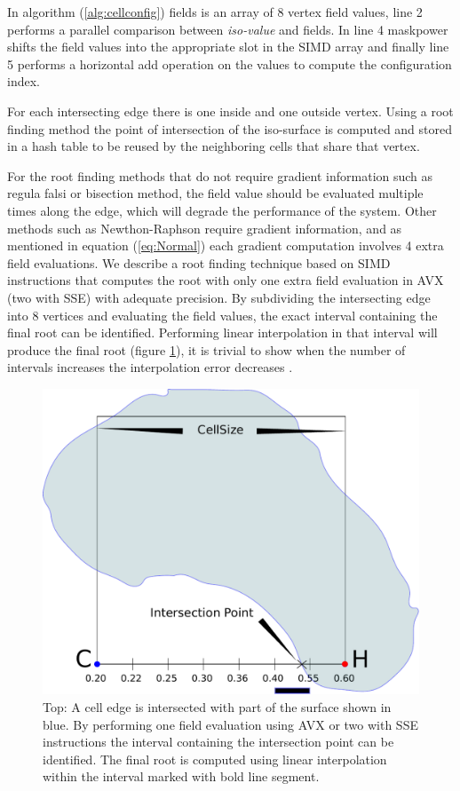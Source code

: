In algorithm (\ref{alg:cellconfig}) fields is an array of 8 vertex field values, 
line 2 performs a parallel comparison between \textit{iso-value} and fields. 
In line 4 maskpower shifts the field values into the appropriate slot in the SIMD array and finally line 5
performs a horizontal add operation on the values to compute the configuration index.

For each intersecting edge there is one inside and one outside vertex.
Using a root finding method the point of intersection of the iso-surface is computed and stored in a 
hash table to be reused by the neighboring cells that share that vertex. 

For the root finding methods that do not require gradient information such as regula falsi or bisection method, 
the field value should be evaluated multiple times along the edge, which will degrade the performance of the system. Other methods 
such as Newthon-Raphson require gradient information, and as mentioned in equation (\ref{eq:Normal})
each gradient computation involves 4 extra field evaluations. We describe a root finding
technique based on SIMD instructions that computes the root with only one extra field evaluation in AVX (two with SSE) 
with adequate precision. By subdividing the intersecting edge into 8 vertices and evaluating the field values, the exact interval 
containing the final root can be identified. Performing linear interpolation in that interval will produce the 
final root (figure \ref{fig:root}), it is trivial to show when the number of intervals increases the interpolation error decreases \cite{Matthews1987}. 

\begin{figure}[H]
  \centering
  \includegraphics[width=0.8\linewidth]{figures/cpupoly/root.pdf}
  \caption{\label{fig:root}
  {Top: A cell edge is intersected with part of the surface shown in blue.  By performing one field evaluation using 
  AVX or two with SSE instructions the interval containing the intersection point can be identified. 
  The final root is computed using linear interpolation within the interval marked with bold line segment.}
}
\end{figure}


